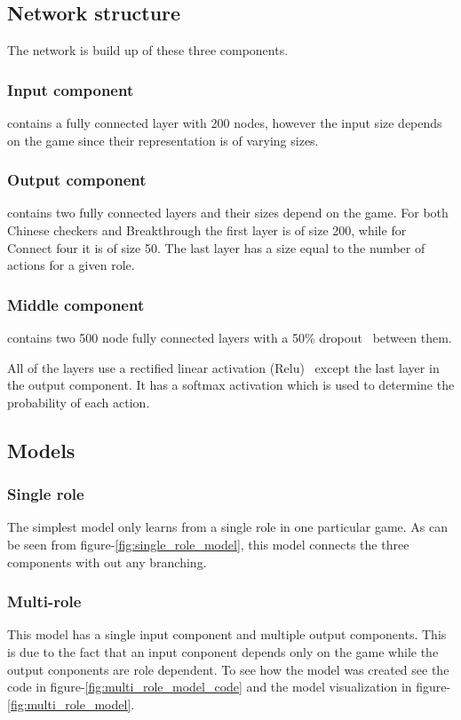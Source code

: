 \documentclass[twocolumn, letterpaper, 10 pt, conference]{ieeeconf}  %
\begin{document}
    \subsection{Network structure}
        The network is build up of these three components. 
        
        \subsubsection{Input component} contains a fully connected layer with 200 nodes, however the input size depends on the game since their representation is of varying sizes.
    
        \subsubsection{Output component} contains two fully connected layers and their sizes depend on the game. For both Chinese checkers and Breakthrough the first layer is of size 200, while for Connect four it is of size 50. The last layer has a size equal to the number of actions for a given role.
        
        \subsubsection{Middle component} contains two 500 node fully connected layers with a 50\% dropout~\cite{hinton2012improving} between them.

        All of the layers use a rectified linear activation (Relu)~\cite{nair2010rectified} except the last layer in the output component. It has a softmax activation which is used to determine the probability of each action.
        
    \subsection{Models}
        \subsubsection{Single role} The simplest model only learns from a single role in one particular game. As can be seen from figure-\ref{fig:single_role_model}, this model connects the three components with out any branching.

        \subsubsection{Multi-role} This model has a single input component and multiple output components. This is due to the fact that an input conponent depends only on the game while the output conponents are role dependent. To see how the model was created see the code in figure-\ref{fig:multi_role_model_code} and the model visualization in figure-\ref{fig:multi_role_model}.
\end{document}
